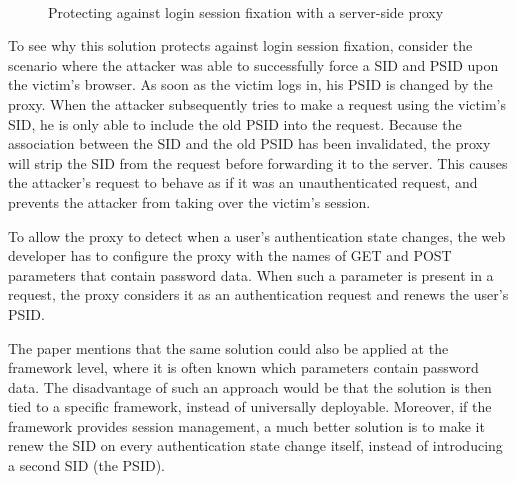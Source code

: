 \begin{figure}[htb]
	\centering
	\\
	\caption[Protecting against login session fixation with a server-side proxy]{\label{fig:johnsfixation}Protecting against login session fixation with a server-side proxy \cite{Johns2011}}
\end{figure}

To see why this solution protects against login session fixation, consider the scenario where the attacker was able to successfully force a SID and PSID upon the victim's browser. As soon as the victim logs in, his PSID is changed by the proxy. When the attacker subsequently tries to make a request using the victim's SID, he is only able to include the old PSID into the request. Because the association between the SID and the old PSID has been invalidated, the proxy will strip the SID from the request before forwarding it to the server. This causes the attacker's request to behave as if it was an unauthenticated request, and prevents the attacker from taking over the victim's session.

To allow the proxy to detect when a user's authentication state changes, the web developer has to configure the proxy with the names of GET and POST parameters that contain password data. When such a parameter is present in a request, the proxy considers it as an authentication request and renews the user's PSID.

The paper mentions that the same solution could also be applied at the framework level, where it is often known which parameters contain password data. The disadvantage of such an approach would be that the solution is then tied to a specific framework, instead of universally deployable. Moreover, if the framework provides session management, a much better solution is to make it renew the SID on every authentication state change itself, instead of introducing a second SID (the PSID).

